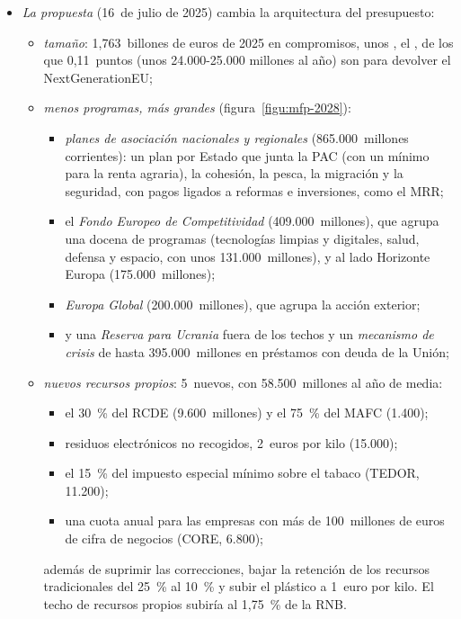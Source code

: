 \documentclass[11pt]{article}
\begin{document}
\begin{itemize}
\item \emph{La propuesta} (16~de julio de 2025) cambia la arquitectura del presupuesto\nocite{CE2025MFP2028,CE2026Explicado}:
  \begin{itemize}
  \item \emph{tamaño}: 1,763~billones de euros de 2025 en compromisos, unos , el , de los que 0,11~puntos (unos 24.000-25.000 millones al año) son para devolver el NextGenerationEU;
  \item \emph{menos programas, más grandes} (figura~\ref{figu:mfp-2028}):
    \begin{itemize}
    \item \emph{planes de asociación nacionales y regionales} (865.000~millones corrientes): un plan por Estado que junta la PAC (con un mínimo para la renta agraria), la cohesión, la pesca, la migración y la seguridad, con pagos ligados a reformas e inversiones, como el MRR;
    \item el \emph{Fondo Europeo de Competitividad} (409.000~millones), que agrupa una docena de programas (tecnologías limpias y digitales, salud, defensa y espacio, con unos 131.000~millones), y al lado Horizonte Europa (175.000~millones);
    \item \emph{Europa Global} (200.000~millones), que agrupa la acción exterior;
    \item y una \emph{Reserva para Ucrania} fuera de los techos y un \emph{mecanismo de crisis} de hasta 395.000~millones en préstamos con deuda de la Unión;
    \end{itemize}
  \item \emph{nuevos recursos propios}: 5~nuevos, con 58.500~millones al año de media\nocite{TCE2026Dictamen}:
    \begin{itemize}
    \item el 30~\% del RCDE (9.600~millones) y el 75~\% del MAFC (1.400);
    \item residuos electrónicos no recogidos, 2~euros por kilo (15.000);
    \item el 15~\% del impuesto especial mínimo sobre el tabaco (TEDOR, 11.200);
    \item una cuota anual para las empresas con más de 100~millones de euros de cifra de negocios (CORE, 6.800);
    \end{itemize}
    además de suprimir las correcciones, bajar la retención de los recursos tradicionales del 25~\% al 10~\% y subir el plástico a 1~euro por kilo. El techo de recursos propios subiría al 1,75~\% de la RNB.

\end{itemize}
\end{itemize}
\end{document}
